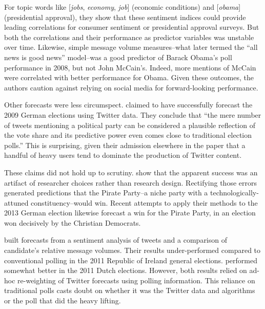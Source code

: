\documentclass{article}
\begin{document}
For topic words like [\textit{jobs}, \textit{economy}, \textit{job}]
(economic conditions) and [\textit{obama}] (presidential approval),
they show that these sentiment indices could provide leading
correlations for consumer sentiment or presidential approval
surveys. But both the correlations and their performance as predictor
variables was unstable over time. Likewise, simple message volume
measures--what \citep{digrazia2013} later termed the ``all news is
good news'' model--was a good predictor of Barack Obama's poll
performance in 2008, but not John McCain's. Indeed, more mentions of
McCain were correlated with better performance for Obama. Given these
outcomes, the authors caution against relying on social media for
forward-looking performance.

Other forecasts were less circumspect. \cite{tumasjan2010election}
claimed to have successfully forecast the 2009 German elections using
Twitter data. They conclude that ``the mere number of tweets
mentioning a political party can be considered a plausible reflection
of the vote share and its predictive power even comes close to
traditional election polls.'' This is surprising, given their
admission elsewhere in the paper that a handful of heavy users tend to
dominate the production of Twitter content. 

These claims did not hold up to scrutiny.
\cite{jungherr2012pirate} show that the apparent success was an
artifact of researcher choices rather than research design. Rectifying
those errors generated predictions that the Pirate Party--a niche
party with a technologically-attuned constituency--would win. Recent
attempts to apply their methods to the 2013 German election likewise
forecast a win for the Pirate Party, in an election won decisively by
the Christian Democrats.

\cite{bermingham2011using} built forecasts from a sentiment analysis
of tweets and a comparison of candidate's relative message
volumes. Their results under-performed compared to conventional
polling in the 2011 Republic of Ireland general
elections. \cite{sang2012predicting} performed somewhat better in the
2011 Dutch elections. However, both results relied on ad-hoc
re-weighting of Twitter forecasts using polling information. This
reliance on traditional polls casts doubt on whether it was the
Twitter data and algorithms or the poll that did the heavy lifting.
\end{document}
